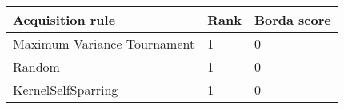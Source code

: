 \begin{tabular}{lll}
Acquisition rule & Rank & Borda score \\ 
\hline 
Maximum Variance Tournament        & 1 & 0 \\ 
Random                             & 1 & 0 \\ 
KernelSelfSparring \citep{Sui2017} & 1 & 0 \\ 
\hline 
\end{tabular}